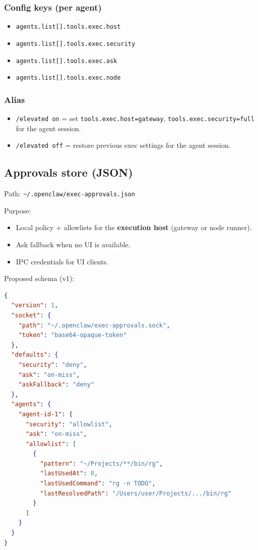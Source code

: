 \subsubsection{Config keys (per agent)}


\begin{itemize}
  \item \texttt{agents.list[].tools.exec.host}
  \item \texttt{agents.list[].tools.exec.security}
  \item \texttt{agents.list[].tools.exec.ask}
  \item \texttt{agents.list[].tools.exec.node}
\end{itemize}


\subsubsection{Alias}


\begin{itemize}
  \item \texttt{/elevated on} = set \texttt{tools.exec.host=gateway}, \texttt{tools.exec.security=full} for the agent session.
  \item \texttt{/elevated off} = restore previous exec settings for the agent session.
\end{itemize}


\subsection{Approvals store (JSON)}


Path: \texttt{\textasciitilde{}/.openclaw/exec-approvals.json}

Purpose:

\begin{itemize}
  \item Local policy + allowlists for the \textbf{execution host} (gateway or node runner).
  \item Ask fallback when no UI is available.
  \item IPC credentials for UI clients.
\end{itemize}


Proposed schema (v1):

\begin{lstlisting}[language=json]
{
  "version": 1,
  "socket": {
    "path": "~/.openclaw/exec-approvals.sock",
    "token": "base64-opaque-token"
  },
  "defaults": {
    "security": "deny",
    "ask": "on-miss",
    "askFallback": "deny"
  },
  "agents": {
    "agent-id-1": {
      "security": "allowlist",
      "ask": "on-miss",
      "allowlist": [
        {
          "pattern": "~/Projects/**/bin/rg",
          "lastUsedAt": 0,
          "lastUsedCommand": "rg -n TODO",
          "lastResolvedPath": "/Users/user/Projects/.../bin/rg"
        }
      ]
    }
  }
}
\end{lstlisting}


